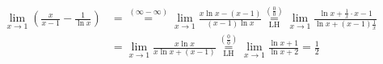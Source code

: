 \begin{example}
  \begin{align*}
    \lim_{x \to 1} (\frac{x}{x-1} - \frac{1}{\ln{x}}) 
    &= \overset{(\infty- \infty)}{=}
    \lim_{x \to 1} \frac{x \ln{x} - (x-1)}{(x-1) \ln{x}}
    \overset{\left(\frac{0}{0}\right)}{\underset{\mathrm{LH}}{=}} \lim_{x \to 1}
    \frac{\ln{x} + \frac{1}{x} \cdot x -1}{\ln{x} + (x-1) \frac{1}{x}} \\
    &= \lim_{x \to 1} \frac{x \ln{x}}{x \ln{x} +(x-1)}
    \overset{\left(\frac{0}{0}\right)}{\underset{\mathrm{LH}}{=}} \lim_{x \to 1}
    \frac{\ln{x} +1}{\ln{x} +2} = \frac{1}{2}
  \end{align*}
  \end{example}
	


